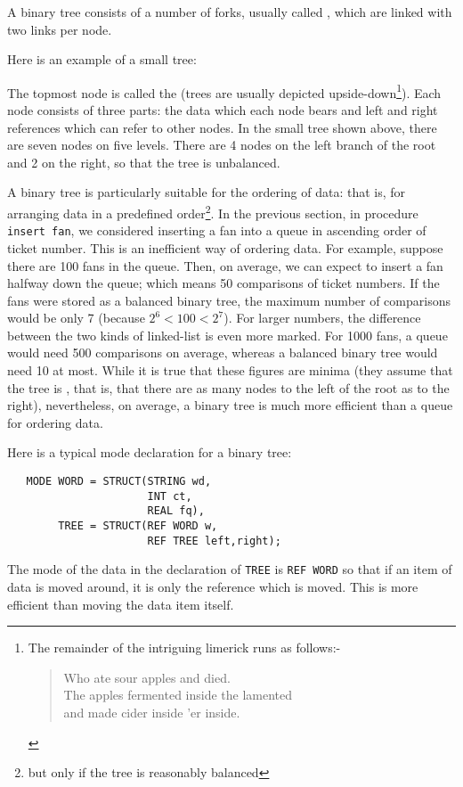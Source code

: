 A binary tree consists of a number of forks, usually called
, which are linked with two links per node.

Here is an example of a small tree:\par
\vfill\goodbreak
\noindent\vbox{}
The topmost node is called the  (trees are
usually depicted upside-down\footnote{The remainder of the intriguing
limerick runs as follows:-
\protect\begin{verse}
Who ate sour apples and died.\protect\\
The apples fermented inside the lamented\protect\\
and made cider inside 'er inside.
\protect\end{verse}}). Each node consists of three parts: the
data which each node bears and left and right references which can
refer to other nodes. In the small tree shown above, there are seven
nodes on five levels. There are 4 nodes on the left branch of the root
and 2 on the right, so that the tree is unbalanced.

A binary tree is particularly suitable for the ordering of data: that
is, for arranging data in a predefined order\footnote{but only if the
tree is reasonably balanced}. In the previous section, in procedure
\verb|insert fan|, we considered inserting a fan into a queue in
ascending order of ticket number. This is an inefficient way of
ordering data. For example, suppose there are 100 fans in the queue.
Then, on average, we can expect to insert a fan halfway down the
queue; which means 50 comparisons of ticket numbers. If the fans were
stored as a balanced binary tree, the maximum number of comparisons
would be only 7 (because $2^6 < 100 < 2^7$). For larger numbers, the
difference between the two kinds of linked-list is even more marked.
For 1000 fans, a queue would need 500 comparisons on average, whereas
a balanced binary tree would need 10 at most. While it is true that
these figures are minima (they assume that the tree is
, that is, that there are as many nodes
to the left of the root as to the right), nevertheless, on average, a
binary tree is much more efficient than a queue for ordering
data.

Here is a typical mode declaration for a binary tree:
\begin{verbatim}
   MODE WORD = STRUCT(STRING wd,
                      INT ct,
                      REAL fq),
        TREE = STRUCT(REF WORD w,
                      REF TREE left,right);
\end{verbatim}
\noindent
The mode of the data in the declaration of \verb|TREE| is
\texttt{REF WORD} so that if an item of data is moved around, it is only the
reference which is moved. This is more efficient than moving the data
item itself.

